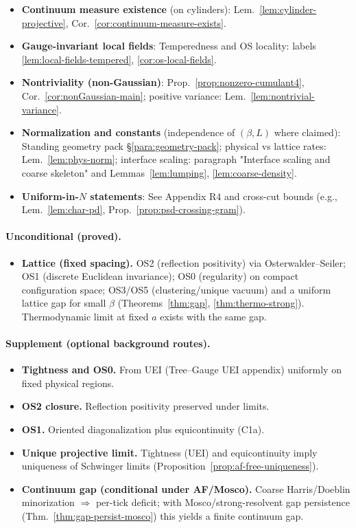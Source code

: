 \documentclass[11pt]{amsart}
\theoremstyle{plain}
\theoremstyle{definition}
\theoremstyle{remark}
\begin{document}
\begin{itemize}
  \item \textbf{Continuum measure existence} (on cylinders): Lem.~\ref{lem:cylinder-projective}, Cor.~\ref{cor:continuum-measure-exists}.
  \item \textbf{Gauge-invariant local fields}: Temperedness and OS locality: labels \ref{lem:local-fields-tempered}, \ref{cor:os-local-fields}.
  \item \textbf{Nontriviality (non-Gaussian)}: Prop.~\ref{prop:nonzero-cumulant4}, Cor.~\ref{cor:nonGaussian-main}; positive variance: Lem.~\ref{lem:nontrivial-variance}.
  \item \textbf{Normalization and constants} (independence of $(\beta,L)$ where claimed): Standing geometry pack \S\ref{para:geometry-pack}; physical vs lattice rates: Lem.~\ref{lem:phys-norm}; interface scaling: paragraph "Interface scaling and coarse skeleton" and Lemmas~\ref{lem:lumping}, \ref{lem:coarse-density}.
  \item \textbf{Uniform-in-$N$ statements}: See Appendix R4 and cross-cut bounds (e.g., Lem.~\ref{lem:char-pd}, Prop.~\ref{prop:psd-crossing-gram}).
\end{itemize}

\paragraph{Unconditional (proved).}
\begin{itemize}
  \item \textbf{Lattice (fixed spacing).} OS2 (reflection positivity) via Osterwalder--Seiler; OS1 (discrete Euclidean invariance); OS0 (regularity) on compact configuration space; OS3/OS5 (clustering/unique vacuum) and a uniform lattice gap for small $\beta$ (Theorems~\ref{thm:gap}, \ref{thm:thermo-strong}). Thermodynamic limit at fixed $a$ exists with the same gap.
\end{itemize}

\paragraph{Supplement (optional background routes).}
\begin{itemize}
  \item \textbf{Tightness and OS0.} From UEI (Tree--Gauge UEI appendix) uniformly on fixed physical regions.
  \item \textbf{OS2 closure.} Reflection positivity preserved under limits.
  \item \textbf{OS1.} Oriented diagonalization plus equicontinuity (C1a).
  \item \textbf{Unique projective limit.} Tightness (UEI) and equicontinuity imply uniqueness of Schwinger limits (Proposition~\ref{prop:af-free-uniqueness}).
  \item \textbf{Continuum gap (conditional under AF/Mosco).} Coarse Harris/Doeblin minorization $\Rightarrow$ per-tick deficit; with Mosco/strong-resolvent gap persistence (Thm.~\ref{thm:gap-persist-mosco}) this yields a finite continuum gap.
\end{itemize}
\end{document}
